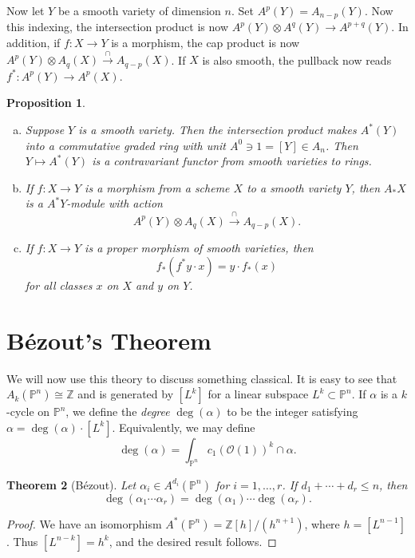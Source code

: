 \documentclass[leqno, openany]{memoir}
\newtheorem{thm}{Theorem}[section]
\newtheorem{prop}[thm]{Proposition}
\theoremstyle{definition}
\theoremstyle{remark}
\theoremstyle{plain}
\theoremstyle{definition}
\theoremstyle{remark}
\newcommand{\Z}{\mathbb{Z}}
\renewcommand{\P}{\mathbb{P}}
\newcommand{\mc}[1]{\mathcal{#1}}
\begin{document}
Now let $Y$ be a smooth variety of dimension $n$. Set $A^p(Y) = A_{n-p}(Y)$. Now this indexing, the intersection product is now $A^p(Y) \otimes A^q(Y) \to A^{p + q}(Y)$. In addition, if $f \colon X \to Y$ is a morphism, the cap product is now $A^p(Y) \otimes A_q(X) \xrightarrow{\cap} A_{q-p}(X)$. If $X$ is also smooth, the pullback now reads $f^* \colon A^p(Y) \to A^p(X)$. 

\begin{prop}\leavevmode
    \begin{enumerate}[(a)]
        \item Suppose $Y$ is a smooth variety. Then the intersection product makes $A^*(Y)$ into a commutative graded ring with unit $A^0 \ni 1 = [Y] \in A_n$. Then $Y \mapsto A^*(Y)$ is a contravariant functor from smooth varieties to rings.
        \item If $f \colon X \to Y$ is a morphism from a scheme $X$ to a smooth variety $Y$, then $A_* X$ is a $A^* Y$-module with action
            \[ A^p(Y) \otimes A_q(X) \xrightarrow{\cap} A_{q-p}(X). \]
        \item If $f \colon X \to Y$ is a proper morphism of smooth varieties, then
            \[ f_* (f^*y \cdot x) = y \cdot f_*(x) \]
            for all classes $x$ on $X$ and $y$ on $Y$.
    \end{enumerate}
\end{prop}

\section{B\'ezout's Theorem}%
\label{sec:bezout_s_theorem}

We will now use this theory to discuss something classical. It is easy to see that $A_k(\P^n) \cong \Z$ and is generated by $[L^k]$ for a linear subspace $L^k \subset \P^n$. If $\alpha$ is a $k$-cycle on $\P^n$, we define the \textit{degree} $\deg (\alpha)$ to be the integer satisfying $\alpha = \deg (\alpha) \cdot [L^k]$. Equivalently, we may define
\[ \deg(\alpha) = \int_{\P^n} {c_1(\mc{O}(1))}^k \cap \alpha. \]

\begin{thm}[B\'ezout]
    Let $\alpha_i \in A^{d_i}(\P^n)$ for $i = 1, \ldots, r$. If $d_1 + \cdots + d_r \leq n$, then
    \[ \deg(\alpha_1 \cdots \alpha_r) = \deg(\alpha_1) \cdots \deg(\alpha_r). \]
\end{thm}

\begin{proof}
    We have an isomorphism $A^*(\P^n) = \Z[h]/(h^{n+1})$, where $h = [L^{n-1}]$. Thus $[L^{n-k}] = h^k$, and the desired result follows.
\end{proof}
\end{document}
